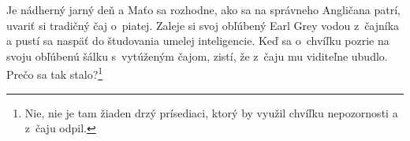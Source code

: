Je nádherný jarný deň a Maťo sa rozhodne, ako sa na správneho Angličana
patrí, uvariť si tradičný čaj o~piatej. Zaleje si svoj obľúbený Earl
Grey vodou z~čajníka a pustí sa naspäť do študovania umelej
inteligencie. Keď sa o~chvíľku pozrie na svoju obľúbenú šálku
s~vytúženým čajom, zistí, že z~čaju mu viditeľne ubudlo. Prečo sa tak
stalo?\footnote{Nie, nie je tam žiaden drzý prísediaci, ktorý by využil chvíľku nepozornosti a z~čaju odpil.}

